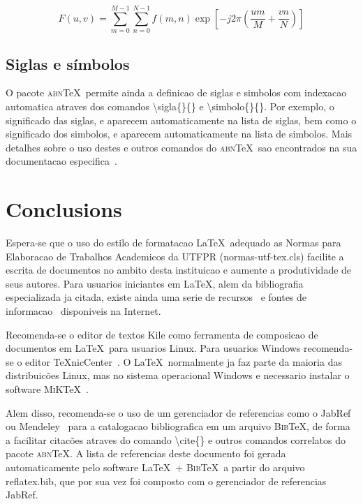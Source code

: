 \documentclass[openright]{normas-utf-tex} %
\begin{document}
\begin{equation}
F(u, v) = \sum_{m = 0}^{M - 1} \sum_{n = 0}^{N - 1} f(m, n) \exp \left[ -j 2 \pi \left( \frac{u m}{M} + \frac{v n}{N} \right) \right]
\label{eq:dft}
\end{equation}

\section{Siglas e símbolos}

O pacote \textsc{abn}\TeX\ permite ainda a definicao de siglas e simbolos com indexacao automatica atraves dos comandos {\ttfamily \textbackslash sigla\{\}\{\}} e {\ttfamily \textbackslash simbolo\{\}\{\}}. Por exemplo, o significado das siglas, e aparecem automaticamente na lista de siglas, bem como o significado dos simbolos, e aparecem automaticamente na lista de simbolos. Mais detalhes sobre o uso destes e outros comandos do \textsc{abn}\TeX\ sao encontrados na sua documentacao especifica~\cite{abnTeX2009}.


\chapter{Conclusions}

Espera-se que o uso do estilo de formatacao \LaTeX\ adequado as Normas para Elaboracao de Trabalhos Academicos da UTFPR ({\ttfamily normas-utf-tex.cls}) facilite a escrita de documentos no ambito desta instituicao e aumente a produtividade de seus autores. Para usuarios iniciantes em \LaTeX, alem da bibliografia especializada ja citada, existe ainda uma serie de recursos~\cite{CTAN2009} e fontes de informacao~\cite{TeX-Br2009,Wikibooks2009} disponiveis na Internet.

Recomenda-se o editor de textos Kile como ferramenta de composicao de documentos em \LaTeX\ para usuarios Linux. Para usuarios Windows recomenda-se o editor \TeX nicCenter~\cite{TeXnicCenter2009}. O \LaTeX\ normalmente ja faz parte da maioria das distribuic\~oes Linux, mas no sistema operacional Windows e necessario instalar o software \textsc{MiK}\TeX~\cite{MiKTeX2009}.

Alem disso, recomenda-se o uso de um gerenciador de referencias como o JabRef~\cite{JabRef2009} ou Mendeley~\cite{Mendeley2009} para a catalogacao bibliografica em um arquivo \textsc{Bib}\TeX, de forma a facilitar citac\~oes atraves do comando {\ttfamily \textbackslash cite\{\}} e outros comandos correlatos do pacote \textsc{abn}\TeX. A lista de referencias deste documento foi gerada automaticamente pelo software \LaTeX\ + \textsc{Bib}\TeX\ a partir do arquivo {\ttfamily reflatex.bib}, que por sua vez foi composto com o gerenciador de referencias JabRef.
\end{document}
